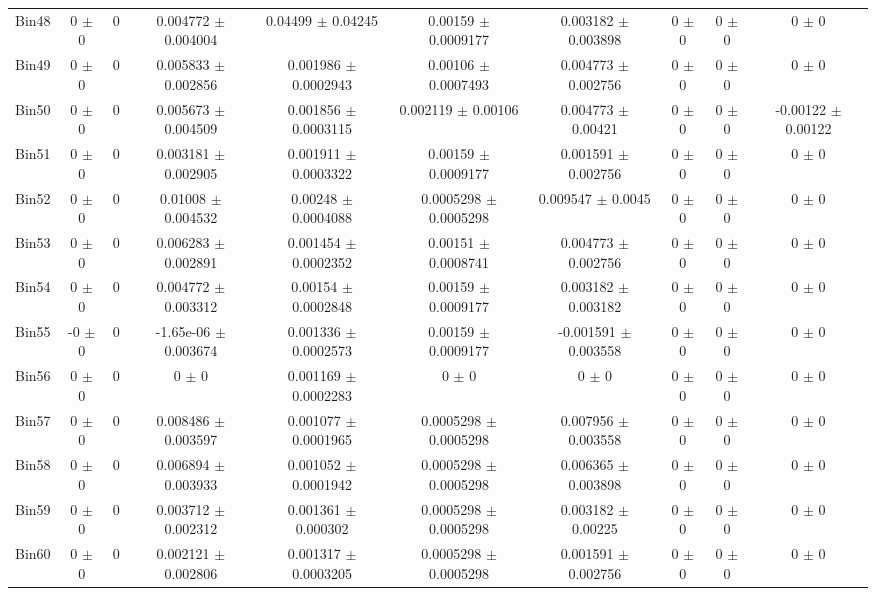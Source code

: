 \begin{tabular}{@{\extracolsep{4pt}}lccccccccc@{}}
     Bin48 & 0 $\pm$ 0 & 0 & 0.004772 $\pm$ 0.004004 & 0.04499 $\pm$ 0.04245 & 0.00159 $\pm$ 0.0009177 & 0.003182 $\pm$ 0.003898 & 0 $\pm$ 0 & 0 $\pm$ 0 & 0 $\pm$ 0 \\ 
     Bin49 & 0 $\pm$ 0 & 0 & 0.005833 $\pm$ 0.002856 & 0.001986 $\pm$ 0.0002943 & 0.00106 $\pm$ 0.0007493 & 0.004773 $\pm$ 0.002756 & 0 $\pm$ 0 & 0 $\pm$ 0 & 0 $\pm$ 0 \\ 
     Bin50 & 0 $\pm$ 0 & 0 & 0.005673 $\pm$ 0.004509 & 0.001856 $\pm$ 0.0003115 & 0.002119 $\pm$ 0.00106 & 0.004773 $\pm$ 0.00421 & 0 $\pm$ 0 & 0 $\pm$ 0 & -0.00122 $\pm$ 0.00122 \\ 
     Bin51 & 0 $\pm$ 0 & 0 & 0.003181 $\pm$ 0.002905 & 0.001911 $\pm$ 0.0003322 & 0.00159 $\pm$ 0.0009177 & 0.001591 $\pm$ 0.002756 & 0 $\pm$ 0 & 0 $\pm$ 0 & 0 $\pm$ 0 \\ 
     Bin52 & 0 $\pm$ 0 & 0 & 0.01008 $\pm$ 0.004532 & 0.00248 $\pm$ 0.0004088 & 0.0005298 $\pm$ 0.0005298 & 0.009547 $\pm$ 0.0045 & 0 $\pm$ 0 & 0 $\pm$ 0 & 0 $\pm$ 0 \\ 
     Bin53 & 0 $\pm$ 0 & 0 & 0.006283 $\pm$ 0.002891 & 0.001454 $\pm$ 0.0002352 & 0.00151 $\pm$ 0.0008741 & 0.004773 $\pm$ 0.002756 & 0 $\pm$ 0 & 0 $\pm$ 0 & 0 $\pm$ 0 \\ 
     Bin54 & 0 $\pm$ 0 & 0 & 0.004772 $\pm$ 0.003312 & 0.00154 $\pm$ 0.0002848 & 0.00159 $\pm$ 0.0009177 & 0.003182 $\pm$ 0.003182 & 0 $\pm$ 0 & 0 $\pm$ 0 & 0 $\pm$ 0 \\ 
     Bin55 & -0 $\pm$ 0 & 0 & -1.65e-06 $\pm$ 0.003674 & 0.001336 $\pm$ 0.0002573 & 0.00159 $\pm$ 0.0009177 & -0.001591 $\pm$ 0.003558 & 0 $\pm$ 0 & 0 $\pm$ 0 & 0 $\pm$ 0 \\ 
     Bin56 & 0 $\pm$ 0 & 0 & 0 $\pm$ 0 & 0.001169 $\pm$ 0.0002283 & 0 $\pm$ 0 & 0 $\pm$ 0 & 0 $\pm$ 0 & 0 $\pm$ 0 & 0 $\pm$ 0 \\ 
     Bin57 & 0 $\pm$ 0 & 0 & 0.008486 $\pm$ 0.003597 & 0.001077 $\pm$ 0.0001965 & 0.0005298 $\pm$ 0.0005298 & 0.007956 $\pm$ 0.003558 & 0 $\pm$ 0 & 0 $\pm$ 0 & 0 $\pm$ 0 \\ 
     Bin58 & 0 $\pm$ 0 & 0 & 0.006894 $\pm$ 0.003933 & 0.001052 $\pm$ 0.0001942 & 0.0005298 $\pm$ 0.0005298 & 0.006365 $\pm$ 0.003898 & 0 $\pm$ 0 & 0 $\pm$ 0 & 0 $\pm$ 0 \\ 
     Bin59 & 0 $\pm$ 0 & 0 & 0.003712 $\pm$ 0.002312 & 0.001361 $\pm$ 0.000302 & 0.0005298 $\pm$ 0.0005298 & 0.003182 $\pm$ 0.00225 & 0 $\pm$ 0 & 0 $\pm$ 0 & 0 $\pm$ 0 \\ 
     Bin60 & 0 $\pm$ 0 & 0 & 0.002121 $\pm$ 0.002806 & 0.001317 $\pm$ 0.0003205 & 0.0005298 $\pm$ 0.0005298 & 0.001591 $\pm$ 0.002756 & 0 $\pm$ 0 & 0 $\pm$ 0 & 0 $\pm$ 0 \\ 
\hline\hline
  \end{tabular}

